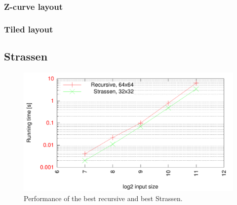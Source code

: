 \subsubsection{Z-curve layout}



\subsubsection{Tiled layout}


\subsection{Strassen}


\begin{figure}[h!]
  \centering
  \includegraphics[width=\textwidth]{"../project2/gnuplots/recursive_vs_strassen_performance"}
  \caption{Performance of the best recursive and best Strassen.}
  \label{fig:recursive_vs_strassen_performance}
\end{figure}

